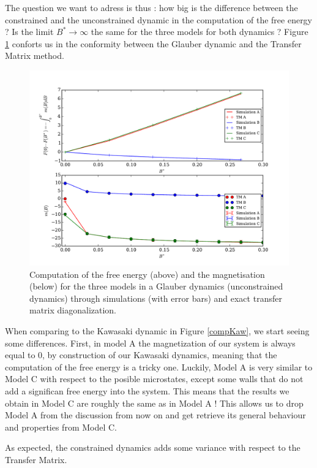 The question we want to adress is thus : how big is the difference between the constrained and the unconstrained dynamic in the computation of the free energy ? Is the limit $B^{\ast} \rightarrow \infty$ the same for the three models for both dynamics ? 
Figure \ref{compGlau} conforts us in the conformity between the Glauber dynamic and the Transfer Matrix method. 

\begin{figure}[h]
  \includegraphics[width=13cm]{tm/ModGlau.pdf}
  \caption{Computation of the free energy (above) and the magnetisation (below) for the three models in a Glauber dynamics (unconstrained dynamics) through simulations (with error bars) and exact transfer matrix diagonalization.}
  \label{compGlau}
\end{figure}

When comparing to the Kawasaki dynamic in Figure \ref{compKaw}, we start seeing some differences. First, in model A the magnetization of our system is always  equal to $0$, by construction of our Kawasaki dynamics, meaning that the computation of the free energy is a tricky one. Luckily, Model A is very similar to Model C with respect to the posible microstates, except some walls that do not add a significan free energy into the system. This means that the results we obtain in Model C are roughly the same as in Model A ! This allows us to drop Model A from the discussion from now on and get retrieve its general behaviour and properties from Model C.

As expected, the constrained dynamics adds some variance with respect to the Transfer Matrix. 

